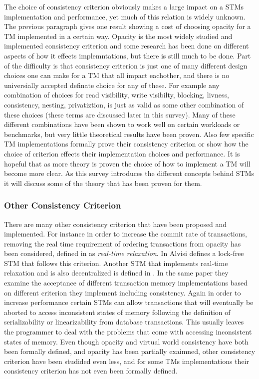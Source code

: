 The choice of consistency criterion obviously makes a large impact on a STMs implementation and performance, yet much of this relation is widely unknown.
The previous paragraph gives one result showing a cost of choosing opacity for a TM implemented in a certain way.
Opacity is the most widely studied and implemented consistency criterion and some research has been done on different aspects of how it effects implemntations, but there is still much to be done.
Part of the difficulty is that consistency criterion is just one of many different design choices one can make for a TM that all impact eachother, and there is no universially accepted definate choice for any of these.
For example any combination of choices for read visibility, write visibilty, blocking, livness, consistency, nesting, privatiztion, is just as valid as some other combination of these choices (these terms are discussed later in this survey).
Many of these different combinations have been shown to work well on certain workloads or benchmarks, but very little theoretical results have been proven.
Also few specific TM implementations formally prove their consistency criterion or show how the choice of criterion effects their implementation choices and performance.
It is hopeful that as more theory is proven the choice of how to implement a TM will become more clear.
As this survey introduces the different concepts behind STMs it will discuss some of the theory that has been proven for them.

\subsubsection{Other Consistency Criterion}
There are many other consistency criterion that have been proposed and implemented.
For instance in order to increase the commit rate of transactions, removing the real time requirement of ordering transactions from opacity has been considered, defined in \cite{LPD-ARTICLE-2009-004} as \emph{real-time relaxation}.
In \cite{Alvisi_lock-freeserializable} Alvisi defines a lock-free STM that follows this criterion.
Another STM that implements real-time relaxation and is also decentralized is defined in \cite{LPD-ARTICLE-2009-004}.
In the same paper they examine the acceptance of different transaction memory implementations based on different criterion they implement including consistency.
Again in order to increase performance certain STMs can allow transactions that will eventually be aborted to access inconsistent states of memory following the definition of serializability or linearizability from database transactions.
This usually leaves the programmer to deal with the problems that come with accessing inconsistent states of memory.
Even though opacity and virtual world consistency have both been formally defined, and opacity has been partially exaimned, other consistency criterion have been studided even less, and for some TMs implementations their consistency criterion has not even been formally defined.

